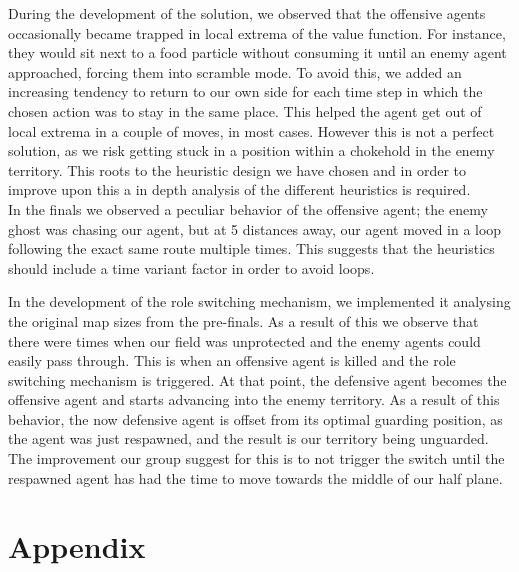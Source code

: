 \documentclass[a4paper,12pt]{article}
\begin{document}
During the development of the solution, we observed that the offensive agents occasionally became trapped in local extrema of the value function. For instance, they would sit next to a food particle without consuming it until an enemy agent approached, forcing them into scramble mode.
To avoid this, we added an increasing tendency to return to our own side for each time step in which the chosen action was to stay in the same place. 
This helped the agent get out of local extrema in a couple of moves, in most cases. 
However this is not a perfect solution, as we risk getting stuck in a position within a chokehold in the enemy territory. This roots to the heuristic design we have chosen and in order to improve upon this a in depth analysis of the different heuristics is required. \\

In the finals we observed a peculiar behavior of the offensive agent; the enemy ghost was chasing our agent, but at 5 distances away, our agent moved in a loop following the exact same route multiple times. 
This suggests that the heuristics should include a time variant factor in order to avoid loops.

In the development of the role switching mechanism, we implemented it analysing the original map sizes from the pre-finals. 
As a result of this we observe that there were times when our field was unprotected and the enemy agents could easily pass through. 
This is when an offensive agent is killed and the role switching mechanism is triggered. At that point, the defensive agent becomes the offensive agent and starts advancing into the enemy territory.
As a result of this behavior, the now defensive agent is offset from its optimal guarding position, as the agent was just respawned, and the result is our territory being unguarded. 
The improvement our group suggest for this is to not trigger the switch until the respawned agent has had the time to move towards the middle of our half plane.








\printbibliography
\newpage

\appendix
\section{Appendix}
\label{sec:appendix}
\end{document}
